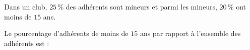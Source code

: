 
Dans un club, $25\,\%$ des adhérents sont mineurs et parmi les mineurs, $20\,\%$ ont moins de $15$ ans.

Le pourcentage d'adhérents de moins de $15$ ans par rapport à l'ensemble des adhérents est :

\smallskip
{}
